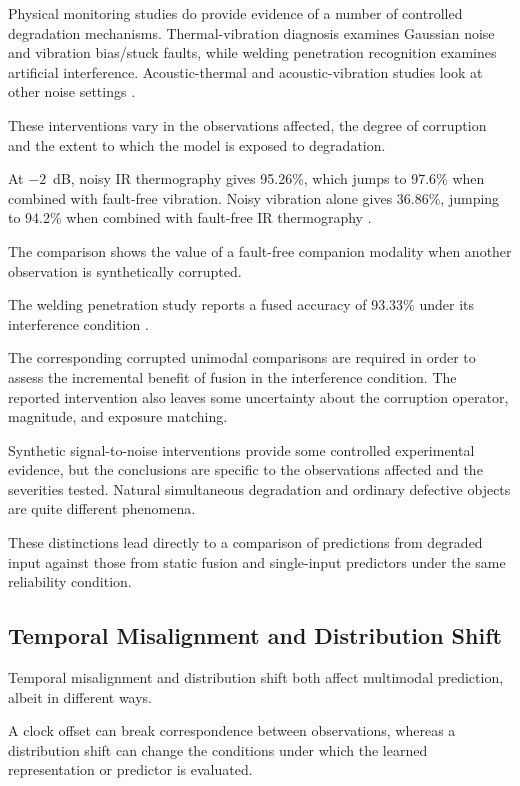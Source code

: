 Physical monitoring studies do provide evidence of a number of controlled degradation mechanisms.
Thermal-vibration diagnosis examines Gaussian noise and vibration bias/stuck faults, while welding
penetration recognition examines artificial interference. Acoustic-thermal and acoustic-vibration
studies look at other noise settings
\parencite{Huo2022Multisensor,Hua2026Weld,Ying2025Trustworthy,Huang2026Rolling}.

These interventions vary in the observations affected, the degree of corruption and the extent to
which the model is exposed to degradation.

At $-2$~dB, noisy IR thermography gives 95.26\%, which jumps to 97.6\% when combined with fault-free
vibration. Noisy vibration alone gives 36.86\%, jumping to 94.2\% when combined with fault-free IR
thermography \parencite[Table~VIII]{Huo2022Multisensor}.

The comparison shows the value of a fault-free companion modality when another observation is
synthetically corrupted.

The welding penetration study reports a fused accuracy of 93.33\% under its interference condition
\parencite[Table~3]{Hua2026Weld}.

The corresponding corrupted unimodal comparisons are required in order to assess the incremental
benefit of fusion in the interference condition. The reported intervention also leaves some
uncertainty about the corruption operator, magnitude, and exposure matching.

Synthetic signal-to-noise interventions provide some controlled experimental evidence, but the
conclusions are specific to the observations affected and the severities tested. Natural
simultaneous degradation and ordinary defective objects are quite different phenomena.

These distinctions lead directly to a comparison of predictions from degraded input against those
from static fusion and single-input predictors under the same reliability condition.

\subsection{Temporal Misalignment and Distribution Shift}

Temporal misalignment and distribution shift both affect multimodal prediction, albeit in different
ways.

A clock offset can break correspondence between observations, whereas a distribution shift can
change the conditions under which the learned representation or predictor is evaluated.

